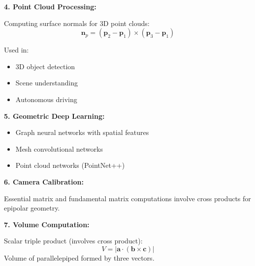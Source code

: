 \documentclass[12pt,a4paper]{article}
\theoremstyle{definition}
\begin{document}
\begin{tcolorbox}[enhanced,breakable,colback=purple!5!white,colframe=purple!75!black,title=ML/DL Applications of Cross Product]
\textbf{4. Point Cloud Processing:}

Computing surface normals for 3D point clouds:
\begin{equation}
\mathbf{n}_p = (\mathbf{p}_2 - \mathbf{p}_1) \times (\mathbf{p}_3 - \mathbf{p}_1)
\end{equation}

Used in:
\begin{itemize}
    \item 3D object detection
    \item Scene understanding
    \item Autonomous driving
\end{itemize}

\textbf{5. Geometric Deep Learning:}

\begin{itemize}
    \item Graph neural networks with spatial features
    \item Mesh convolutional networks
    \item Point cloud networks (PointNet++)
\end{itemize}

\textbf{6. Camera Calibration:}

Essential matrix and fundamental matrix computations involve cross products for epipolar geometry.

\textbf{7. Volume Computation:}

Scalar triple product (involves cross product):
\begin{equation}
V = |\mathbf{a} \cdot (\mathbf{b} \times \mathbf{c})|
\end{equation}
Volume of parallelepiped formed by three vectors.
\end{tcolorbox}
\end{document}
